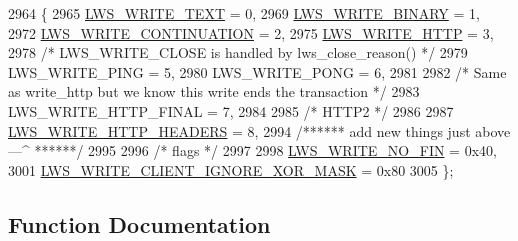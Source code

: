 \begin{DoxyCode}
2964                         \{
2965         \hyperlink{group__sending-data_gga98b099cf8c1c7e38ad78501f270e193da80e8f169fda236c56bfb795ed62903db}{LWS\_WRITE\_TEXT}                                            = 0,
2969         \hyperlink{group__sending-data_gga98b099cf8c1c7e38ad78501f270e193daf6486c0dba50c44198100717721d9ab2}{LWS\_WRITE\_BINARY}                                        = 1,
2972         \hyperlink{group__sending-data_gga98b099cf8c1c7e38ad78501f270e193da10047eb05b5e1c298151dc47a5b44826}{LWS\_WRITE\_CONTINUATION}                                    = 2,
2975         \hyperlink{group__sending-data_gga98b099cf8c1c7e38ad78501f270e193dabb6705e1d1327cdda5025be28f07712e}{LWS\_WRITE\_HTTP}                                            = 3,
2978         \textcolor{comment}{/* LWS\_WRITE\_CLOSE is handled by lws\_close\_reason() */}
2979         LWS\_WRITE\_PING                                          = 5,
2980         LWS\_WRITE\_PONG                                          = 6,
2981 
2982         \textcolor{comment}{/* Same as write\_http but we know this write ends the transaction */}
2983         LWS\_WRITE\_HTTP\_FINAL                                    = 7,
2984 
2985         \textcolor{comment}{/* HTTP2 */}
2986 
2987         \hyperlink{group__sending-data_gga98b099cf8c1c7e38ad78501f270e193dafe5a38e940ce56708ac814627e9c0917}{LWS\_WRITE\_HTTP\_HEADERS}                                    = 8,
2994         \textcolor{comment}{/****** add new things just above ---^ ******/}
2995 
2996         \textcolor{comment}{/* flags */}
2997 
2998         \hyperlink{group__sending-data_gga98b099cf8c1c7e38ad78501f270e193da115440f272a5d55518adfc8099acfee3}{LWS\_WRITE\_NO\_FIN} = 0x40,
3001         \hyperlink{group__sending-data_gga98b099cf8c1c7e38ad78501f270e193da220d8e8652d9b97fb66e476e2a60ffce}{LWS\_WRITE\_CLIENT\_IGNORE\_XOR\_MASK} = 0x80
3005 \};
\end{DoxyCode}


\subsection{Function Documentation}
